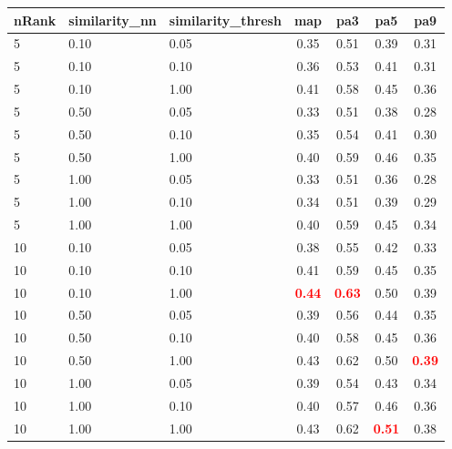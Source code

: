 \documentclass[12pt,a4paper,fleqn]{tufte-handout}
\begin{document}
 
\begin{table}                        
\begin{center}                        
\scriptsize                        
\setlength{\tabcolsep}{.16667em}                        
\begin{tabular}{lllcccc}                        
nRank & similarity\_nn & similarity\_thresh & map & pa3 & pa5 & pa9 \\                        
\hline                        
5 & 0.10 & 0.05 & 0.35 & 0.51 & 0.39 & 0.31 \\                        
5 & 0.10 & 0.10 & 0.36 & 0.53 & 0.41 & 0.31 \\                        
5 & 0.10 & 1.00 & 0.41 & 0.58 & 0.45 & 0.36 \\                        
5 & 0.50 & 0.05 & 0.33 & 0.51 & 0.38 & 0.28 \\                        
5 & 0.50 & 0.10 & 0.35 & 0.54 & 0.41 & 0.30 \\                        
5 & 0.50 & 1.00 & 0.40 & 0.59 & 0.46 & 0.35 \\                        
5 & 1.00 & 0.05 & 0.33 & 0.51 & 0.36 & 0.28 \\                        
5 & 1.00 & 0.10 & 0.34 & 0.51 & 0.39 & 0.29 \\                        
5 & 1.00 & 1.00 & 0.40 & 0.59 & 0.45 & 0.34 \\                        
10 & 0.10 & 0.05 & 0.38 & 0.55 & 0.42 & 0.33 \\                        
10 & 0.10 & 0.10 & 0.41 & 0.59 & 0.45 & 0.35 \\                        
10 & 0.10 & 1.00 & \textbf{\textcolor{red}{0.44}} & \textbf{\textcolor{red}{0.63}} & 0.50 & 0.39 \\                        
10 & 0.50 & 0.05 & 0.39 & 0.56 & 0.44 & 0.35 \\                        
10 & 0.50 & 0.10 & 0.40 & 0.58 & 0.45 & 0.36 \\                        
10 & 0.50 & 1.00 & 0.43 & 0.62 & 0.50 & \textbf{\textcolor{red}{0.39}} \\                        
10 & 1.00 & 0.05 & 0.39 & 0.54 & 0.43 & 0.34 \\                        
10 & 1.00 & 0.10 & 0.40 & 0.57 & 0.46 & 0.36 \\                        
10 & 1.00 & 1.00 & 0.43 & 0.62 & \textbf{\textcolor{red}{0.51}} & 0.38 \\                        

\end{tabular}
\end{center}
\end{table}
\end{document}
